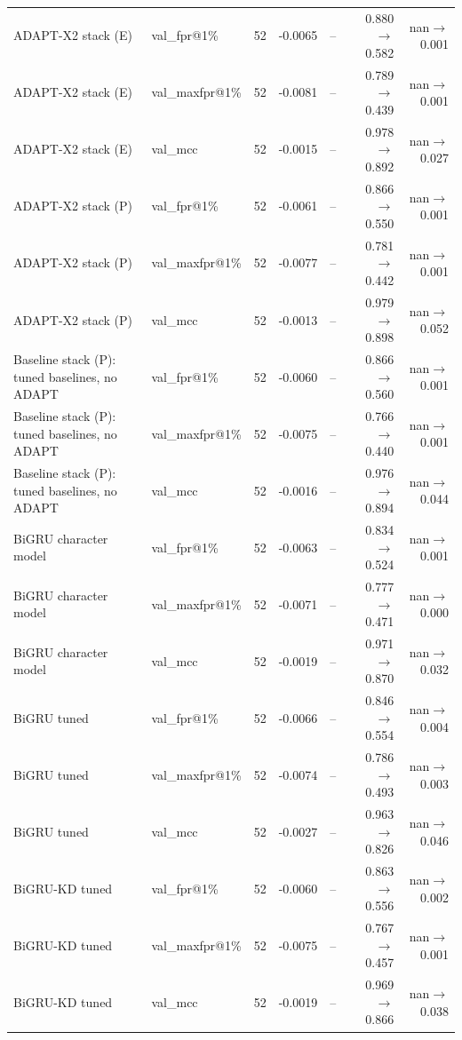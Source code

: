 \begin{table}[t]
\begin{tabular}{llrrrrr}
ADAPT-X2 stack (E) & val\_fpr@1\% & 52 & -0.0065 & -- & 0.880$\rightarrow$0.582 & nan$\rightarrow$0.001 \\
ADAPT-X2 stack (E) & val\_maxfpr@1\% & 52 & -0.0081 & -- & 0.789$\rightarrow$0.439 & nan$\rightarrow$0.001 \\
ADAPT-X2 stack (E) & val\_mcc & 52 & -0.0015 & -- & 0.978$\rightarrow$0.892 & nan$\rightarrow$0.027 \\
ADAPT-X2 stack (P) & val\_fpr@1\% & 52 & -0.0061 & -- & 0.866$\rightarrow$0.550 & nan$\rightarrow$0.001 \\
ADAPT-X2 stack (P) & val\_maxfpr@1\% & 52 & -0.0077 & -- & 0.781$\rightarrow$0.442 & nan$\rightarrow$0.001 \\
ADAPT-X2 stack (P) & val\_mcc & 52 & -0.0013 & -- & 0.979$\rightarrow$0.898 & nan$\rightarrow$0.052 \\
Baseline stack (P): tuned baselines, no ADAPT & val\_fpr@1\% & 52 & -0.0060 & -- & 0.866$\rightarrow$0.560 & nan$\rightarrow$0.001 \\
Baseline stack (P): tuned baselines, no ADAPT & val\_maxfpr@1\% & 52 & -0.0075 & -- & 0.766$\rightarrow$0.440 & nan$\rightarrow$0.001 \\
Baseline stack (P): tuned baselines, no ADAPT & val\_mcc & 52 & -0.0016 & -- & 0.976$\rightarrow$0.894 & nan$\rightarrow$0.044 \\
BiGRU character model & val\_fpr@1\% & 52 & -0.0063 & -- & 0.834$\rightarrow$0.524 & nan$\rightarrow$0.001 \\
BiGRU character model & val\_maxfpr@1\% & 52 & -0.0071 & -- & 0.777$\rightarrow$0.471 & nan$\rightarrow$0.000 \\
BiGRU character model & val\_mcc & 52 & -0.0019 & -- & 0.971$\rightarrow$0.870 & nan$\rightarrow$0.032 \\
BiGRU tuned & val\_fpr@1\% & 52 & -0.0066 & -- & 0.846$\rightarrow$0.554 & nan$\rightarrow$0.004 \\
BiGRU tuned & val\_maxfpr@1\% & 52 & -0.0074 & -- & 0.786$\rightarrow$0.493 & nan$\rightarrow$0.003 \\
BiGRU tuned & val\_mcc & 52 & -0.0027 & -- & 0.963$\rightarrow$0.826 & nan$\rightarrow$0.046 \\
BiGRU-KD tuned & val\_fpr@1\% & 52 & -0.0060 & -- & 0.863$\rightarrow$0.556 & nan$\rightarrow$0.002 \\
BiGRU-KD tuned & val\_maxfpr@1\% & 52 & -0.0075 & -- & 0.767$\rightarrow$0.457 & nan$\rightarrow$0.001 \\
BiGRU-KD tuned & val\_mcc & 52 & -0.0019 & -- & 0.969$\rightarrow$0.866 & nan$\rightarrow$0.038 \\

\end{tabular}
\end{table}
